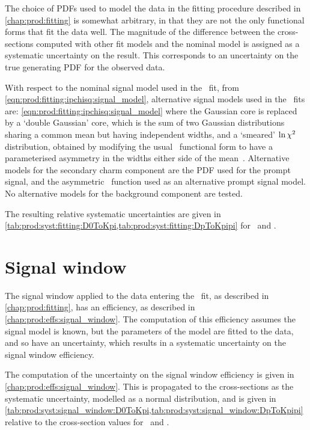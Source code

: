 The choice of \acp{PDF} used to model the data in the fitting procedure
described in \cref{chap:prod:fitting} is somewhat arbitrary, in that they are
not the only functional forms that fit the data well.
The magnitude of the difference between the cross-sections computed with other
fit models and the nominal model is assigned as a systematic uncertainty on the
result.
This corresponds to an uncertainty on the true generating \ac{PDF} for the
observed data.

With respect to the nominal signal model used in the \lnipchisq\ fit, from
\cref{eqn:prod:fitting:ipchisq:signal_model}, alternative signal models used in
the \lnipchisq\ fits are: \cref{eqn:prod:fitting:ipchisq:signal_model} where
the Gaussian core is replaced by a `double Gaussian' core, which is the sum of
two Gaussian distributions sharing a common mean but having independent widths,
and a `smeared' $\ln{\ensuremath{\chi^2}}$ distribution, obtained by modifying the usual
\chisq\ functional form to have a parameterised asymmetry in the widths either
side of the mean~\cite{LHCb-CONF-2016-010}.
Alternative models for the secondary charm component are the \ac{PDF} used for
the prompt signal, and the asymmetric \chisq\ function used as an alternative
prompt signal model.
No alternative models for the background component are tested.

The resulting relative systematic uncertainties are given in
\cref{tab:prod:syst:fitting:D0ToKpi,tab:prod:syst:fitting:DpToKpipi} for \DzToKpi\ and
\DpToKpipi.

\section{Signal window}
\label{chap:prod:syst:signal_window}

The signal window applied to the data entering the \lnipchisq\ fit, as
described in \cref{chap:prod:fitting}, has an efficiency, as described in
\cref{chap:prod:effs:signal_window}.
The computation of this efficiency assumes the signal model is known, but the
parameters of the model are fitted to the data, and so have an uncertainty,
which results in a systematic uncertainty on the signal window efficiency.

The computation of the uncertainty on the signal window efficiency is given in
\cref{chap:prod:effs:signal_window}.
This is propagated to the cross-sections as the systematic uncertainty,
modelled as a normal distribution, and is given in
\cref{tab:prod:syst:signal_window:D0ToKpi,tab:prod:syst:signal_window:DpToKpipi} relative
to the cross-section values for \DzToKpi\ and \DpToKpipi.

